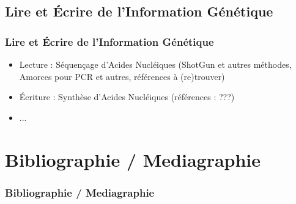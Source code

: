 \documentclass{beamer}
\begin{document}
\subsection{ Lire et {\'E}crire de l'Information G{\'e}n{\'e}tique }
\begin{frame}
	\frametitle{ Lire et {\'E}crire de l'Information G{\'e}n{\'e}tique }
	\begin{itemize}
		\item Lecture : S{\'e}quen\c{c}age d'Acides Nucl{\'e}iques (ShotGun et autres m{\'e}thodes, Amorces pour PCR et autres, r{\'e}f{\'e}rences {\`a} (re)trouver)
		\item {\'E}criture : Synth{\`e}se d'Acides Nucl{\'e}iques (r{\'e}f{\'e}rences : ???)
		\item ... 
	\end{itemize}
\end{frame}


\def\sectionPartBibliographie{Bibliographie / Mediagraphie}
\section{\sectionPartBibliographie}
\begin{frame}[allowframebreaks]
	\frametitle{\sectionPartBibliographie}
	\nocite{*}
	
	
\end{frame}
\end{document}
